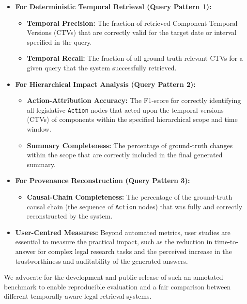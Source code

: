 \documentclass[11pt]{article}
\begin{document}
\begin{itemize}
    \item \textbf{For Deterministic Temporal Retrieval (Query Pattern 1):}
    \begin{itemize}
        \item \textbf{Temporal Precision:} The fraction of retrieved Component Temporal Versions (CTVs) that are correctly valid for the target date or interval specified in the query.
        \item \textbf{Temporal Recall:} The fraction of all ground-truth relevant CTVs for a given query that the system successfully retrieved.
    \end{itemize}

    \item \textbf{For Hierarchical Impact Analysis (Query Pattern 2):}
    \begin{itemize}
        \item \textbf{Action-Attribution Accuracy:} The F1-score for correctly identifying all legislative \texttt{Action} nodes that acted upon the temporal versions (CTVs) of components within the specified hierarchical scope and time window.
        \item \textbf{Summary Completeness:} The percentage of ground-truth changes within the scope that are correctly included in the final generated summary.
    \end{itemize}

    \item \textbf{For Provenance Reconstruction (Query Pattern 3):}
    \begin{itemize}
        \item \textbf{Causal-Chain Completeness:} The percentage of the ground-truth causal chain (the sequence of \texttt{Action} nodes) that was fully and correctly reconstructed by the system.
    \end{itemize}
    
    \item \textbf{User-Centred Measures:} Beyond automated metrics, user studies are essential to measure the practical impact, such as the reduction in time-to-answer for complex legal research tasks and the perceived increase in the trustworthiness and auditability of the generated answers.
\end{itemize}

\noindent We advocate for the development and public release of such an annotated benchmark to enable reproducible evaluation and a fair comparison between different temporally-aware legal retrieval systems.
\end{document}
